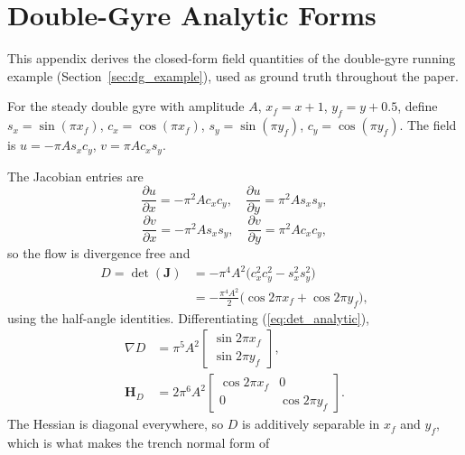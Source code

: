 \documentclass[lettersize,journal]{IEEEtran}
\begin{document}
\section{Double-Gyre Analytic Forms}
\label{app:analytic}

This appendix derives the closed-form field quantities of the
double-gyre running example (Section~\ref{sec:dg_example}), used as
ground truth throughout the paper.

For the steady double gyre with amplitude $A$, $x_f = x + 1$,
$y_f = y + 0.5$, define $s_x = \sin(\pi x_f)$, $c_x = \cos(\pi x_f)$,
$s_y = \sin(\pi y_f)$, $c_y = \cos(\pi y_f)$. The field is
$u = -\pi A s_x c_y$, $v = \pi A c_x s_y$.

The Jacobian entries are
\begin{equation}
    \frac{\partial u}{\partial x} = -\pi^2 A c_x c_y, \quad
    \frac{\partial u}{\partial y} =  \pi^2 A s_x s_y,
\end{equation}
\begin{equation}
    \frac{\partial v}{\partial x} = -\pi^2 A s_x s_y, \quad
    \frac{\partial v}{\partial y} =  \pi^2 A c_x c_y,
\end{equation}
so the flow is divergence free and
\begin{equation}
    \begin{split}
    D = \det(\mathbf{J})
      &= -\pi^4 A^2 \bigl(c_x^2 c_y^2 - s_x^2 s_y^2\bigr) \\
      &= -\frac{\pi^4 A^2}{2}\bigl(\cos 2\pi x_f + \cos 2\pi y_f\bigr),
    \end{split}
    \label{eq:det_analytic}
\end{equation}
using the half-angle identities. Differentiating
(\ref{eq:det_analytic}),
\begin{equation}
    \begin{aligned}
    \nabla D &= \pi^5 A^2
    \begin{bmatrix} \sin 2\pi x_f \\ \sin 2\pi y_f \end{bmatrix},
    \\
    \mathbf{H}_D &= 2\pi^6 A^2
    \begin{bmatrix} \cos 2\pi x_f & 0 \\ 0 & \cos 2\pi y_f \end{bmatrix}.
    \end{aligned}
    \label{eq:gradhess_analytic}
\end{equation}
The Hessian is diagonal everywhere, so $D$ is additively separable in
$x_f$ and $y_f$, which is what makes the trench normal form of
\end{document}
